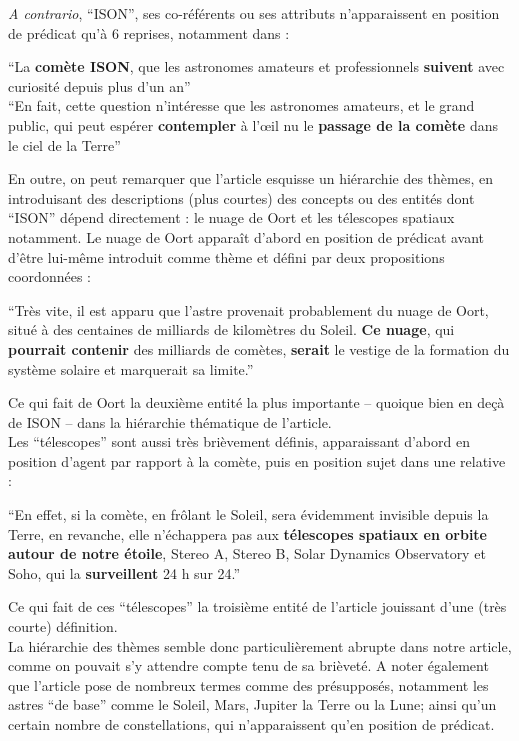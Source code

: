 \documentclass[a4paper,10pt]{article}
\begin{document}
			\textit{A contrario}, ``ISON'', ses co-référents ou ses attributs n'apparaissent en position de prédicat qu'à $6$ reprises, notamment dans :
			\begin{center}
				\footnotesize
				\begin{minipage}{0.7\textwidth}
					``La \textbf{comète ISON}, que les astronomes amateurs et professionnels \textbf{suivent} avec curiosité depuis plus d'un an''\\
					``En fait, cette question n'intéresse que les astronomes amateurs, et le grand public, qui peut espérer \textbf{contempler} à l’œil nu le \textbf{passage de la comète} dans le ciel de la Terre'' 
				\end{minipage}
			\end{center}
			En outre, on peut remarquer que l'article esquisse un hiérarchie des thèmes, en introduisant des descriptions (plus courtes) des concepts ou des entités dont ``ISON'' dépend directement : le nuage de Oort et les télescopes spatiaux notamment. Le nuage de Oort apparaît d'abord en position de prédicat avant d'être lui-même introduit comme thème et défini
			par deux propositions coordonnées :
			\begin{center}
				\footnotesize
				\begin{minipage}{0.7\textwidth}
					``Très vite, il est apparu que l'astre provenait probablement du nuage de Oort, situé à des centaines de milliards de kilomètres du Soleil. \textbf{Ce nuage}, qui \textbf{pourrait contenir} des milliards de comètes, \textbf{serait} le vestige de la formation du système solaire et marquerait sa limite.'' 
				\end{minipage}
			\end{center}
			Ce qui fait de Oort la deuxième entité la plus importante -- quoique bien en deçà de ISON -- dans la hiérarchie thématique de l'article.\\
			Les ``télescopes'' sont aussi très brièvement définis, apparaissant d'abord en position d'agent par rapport à la comète, puis en position sujet dans une relative :
			\begin{center}
				\footnotesize
				\begin{minipage}{0.7\textwidth}
					``En effet, si la comète, en frôlant le Soleil, sera évidemment invisible depuis la Terre, en revanche, elle n'échappera pas aux \textbf{télescopes spatiaux en orbite autour de notre étoile}, Stereo A, Stereo B, Solar Dynamics Observatory et Soho, qui la \textbf{surveillent} 24 h sur 24.'' 
				\end{minipage}
			\end{center}
			Ce qui fait de ces ``télescopes'' la troisième entité de l'article jouissant d'une (très courte) définition.\\
			La hiérarchie des thèmes semble donc particulièrement abrupte dans notre article, comme on pouvait s'y attendre compte tenu de sa brièveté. A noter également que l'article pose de nombreux termes comme des présupposés, notamment les astres ``de base'' comme le Soleil, Mars, Jupiter la Terre ou la Lune; ainsi qu'un certain nombre de constellations, qui n'apparaissent qu'en position de prédicat.
\end{document}

